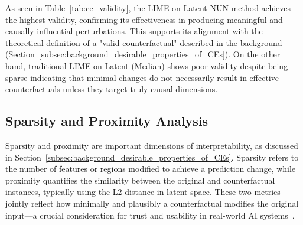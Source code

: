 \begin{table}[htbp]
\centering
{}
\caption{Comparison of counterfactual explanation validity across masking methods.}
\label{tab:ce_validity}
\end{table}

As seen in Table~\ref{tab:ce_validity}, the LIME on Latent NUN method achieves the highest validity, confirming its effectiveness in producing meaningful and causally influential perturbations. This supports its alignment with the theoretical definition of a "valid counterfactual" described in the background (Section~\ref{subsec:background_desirable_properties_of_CEs}). On the other hand, traditional LIME on Latent (Median) shows poor validity despite being sparse indicating that minimal changes do not necessarily result in effective counterfactuals unless they target truly causal dimensions.



\subsection{Sparsity and Proximity Analysis}

Sparsity and proximity are important dimensions of interpretability, as discussed in Section~\ref{subsec:background_desirable_properties_of_CEs}. Sparsity refers to the number of features or regions modified to achieve a prediction change, while proximity quantifies the similarity between the original and counterfactual instances, typically using the L2 distance in latent space. These two metrics jointly reflect how minimally and plausibly a counterfactual modifies the original input—a crucial consideration for trust and usability in real-world AI systems~\cite{Singh1622975}.

